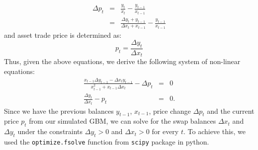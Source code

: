\documentclass[journal,twocolumn,12pt]{ieeesyscoin}
\begin{document}
\begin{eqnarray*}\label{eqn:deltap1}
\Delta p_{t} &=& \frac{y_{t}}{x_{t}} - \frac{y_{t-1}}{x_{t-1}} \\
			 &=& \frac{\Delta y_{t} + y_{t-1}}{\Delta x_{t} + x_{t-1}} - \frac{y_{t-1}}{x_{t-1}}
\end{eqnarray*}
and asset trade price is determined as: 
\begin{equation}\label{eqn:deltap2}
  p_{t} = \frac{\Delta y_{t}}{\Delta x_{t}}
\end{equation}
Thus, given the above equations, we derive the following system of non-linear equations:
\begin{eqnarray}\label{eqn:non_linear_system}
\frac{x_{t-1} \Delta y_{t-1} - \Delta x_{t} y_{t-1}}{x_{t-1}^2 + x_{t-1} \Delta x_{t}} - \Delta p_{t} &=& 0 \\
\frac{\Delta y_{t}}{\Delta x_{t}} - p_{t} &=& 0.
\end{eqnarray}
Since we have the previous balances $y_{t-1}$, $x_{t-1}$, price change $\Delta p_{t}$ and the current price $p_{t}$ from our simulated GBM, we can solve for the swap balances $\Delta x_{t}$ and $\Delta y_{t}$ under the constraints $\Delta y_{t} > 0$ and $\Delta x_{t} > 0$ for every $t$. To achieve this, we used the \verb|optimize.fsolve| function from \verb|scipy| package in python. 
\end{document}
